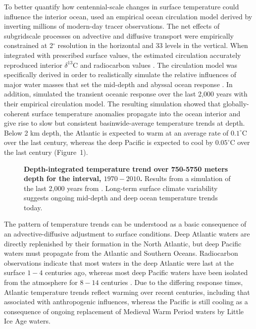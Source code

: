 \documentclass[authoryear,round,12pt]{article}
\begin{document}
To better quantify how centennial-scale changes in surface temperature
could influence the interior ocean, \citet{Gebbie-Huybers-2019:Little}
used an empirical ocean circulation model derived by inverting
millions of modern-day tracer observations. The net effects of
subgridscale processes on advective and diffusive transport were
empirically constrained at 2$^\circ$ resolution in the horizontal and
33 levels in the vertical.  When integrated with prescribed surface
values, the estimated circulation accurately reproduced interior
$\delta^{13}$C \citep{Gebbie-Huybers-2011:How} and radiocarbon values
\citep{Gebbie-Huybers-2012:mean}. The circulation model was
specifically derived in order to realistically simulate the relative
influences of major water masses that set the mid-depth and abyssal
ocean response
\citep[e.g.,][]{Gebbie-Huybers-2010:Total,DeVries-Primeau-2011:Dynamically}. In
addition, \citet{Gebbie-Huybers-2019:Little} simulated the transient
oceanic response over the last 2,000 years with their empirical
circulation model. The resulting simulation showed that
globally-coherent surface temperature anomalies propagate into the
ocean interior and give rise to slow but consistent basinwide-average
temperature trends at depth. Below 2 km depth, the Atlantic is
expected to warm at an average rate of $0.1^\circ$C over the last
century, whereas the deep Pacific is expected to cool by $0.05^\circ$C
over the last century (Figure~1).

\begin{figure}%
\begin{center}
\noindent 
\caption{{\bf Depth-integrated temperature trend over  750-5750 meters depth for the interval, $1970-2010$.} Results from a simulation of the last 2,000 years from \citet{Gebbie-Huybers-2019:Little}. Long-term surface climate variability suggests ongoing mid-depth and deep ocean temperature trends today.}
\end{center} 
\end{figure}

The pattern of temperature trends can be understood as a basic
consequence of an advective-diffusive adjustment to surface
conditions.  Deep Atlantic waters are directly replenished by their
formation in the North Atlantic, but deep Pacific waters must
propagate from the Atlantic and Southern Oceans.  Radiocarbon
observations \citep{Key-Kozyr-2004:global} indicate that most waters
in the deep Atlantic were last at the surface $1-4$ centuries ago,
whereas most deep Pacific waters have been isolated from the
atmosphere for $8-14$ centuries \citep{Gebbie-Huybers-2012:mean}. Due
to the differing response times, Atlantic temperature trends reflect
warming over recent centuries, including that associated with
anthropogenic influences, whereas the Pacific is still cooling as a
consequence of ongoing replacement of Medieval Warm Period waters by
Little Ice Age waters.
\end{document}
